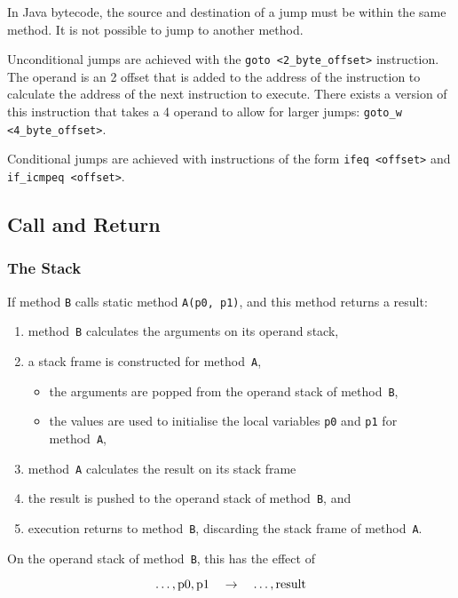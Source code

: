 In Java bytecode, the source and destination of a jump must be within the same method.
It is not possible to jump to another method.

Unconditional jumps are achieved with the \texttt{goto <2\_byte\_offset>} instruction.
The operand is an \SI{2}{\byte} offset that is added to the address of the instruction to calculate the address of the next instruction to execute.
There exists a version of this instruction that takes a \SI{4}{\byte} operand to allow for larger jumps: \texttt{goto\_w <4\_byte\_offset>}.

Conditional jumps are achieved with instructions of the form \texttt{ifeq <offset>} and \texttt{if\_icmpeq <offset>}.

\subsection{Call and Return}

\subsubsection{The Stack}

If method \texttt{B} calls static method \texttt{A(p0, p1)}, and this method returns a result:
\begin{enumerate}
  \item method~\texttt{B} calculates the arguments on its operand stack,
  \item a stack frame is constructed for method~\texttt{A},
  \begin{itemize}
    \item the arguments are popped from the operand stack of method~\texttt{B},
    \item the values are used to initialise the local variables \texttt{p0} and \texttt{p1} for method~\texttt{A},
  \end{itemize}
  \item method~\texttt{A} calculates the result on its stack frame
  \item the result is pushed to the operand stack of method~\texttt{B}, and
  \item execution returns to method~\texttt{B}, discarding the stack frame of method~\texttt{A}.
\end{enumerate}

On the operand stack of method~\texttt{B}, this has the effect of

\begin{equation*}
  \ldots, \textnormal{p0}, \textnormal{p1} \quad \rightarrow \quad \ldots, \textnormal{result}
\end{equation*}


